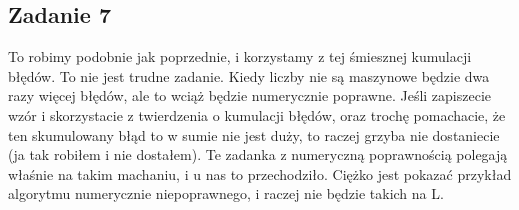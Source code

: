 \documentclass[a4paper]{article}
\begin{document}
\begin{itemize}
\subsection*{Zadanie 7}
To robimy podobnie jak poprzednie, i korzystamy z tej śmiesznej kumulacji błędów. To nie jest trudne zadanie. Kiedy liczby nie są maszynowe będzie dwa razy więcej błędów, ale to wciąż będzie numerycznie poprawne. Jeśli zapiszecie wzór i skorzystacie z twierdzenia o kumulacji błędów, oraz trochę pomachacie, że ten skumulowany błąd to w sumie nie jest duży, to raczej grzyba nie dostaniecie (ja tak robiłem i nie dostałem). Te zadanka z numeryczną poprawnością polegają właśnie na takim machaniu, i u nas to przechodziło. Ciężko jest pokazać przykład algorytmu numerycznie niepoprawnego, i raczej nie będzie takich na L.
\end{itemize}
\end{document}
